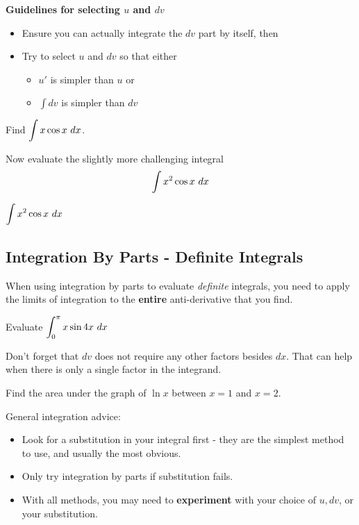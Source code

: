 \begin{boxnote}
{\bf Guidelines for selecting $u$ and $dv$}

\begin{itemize}
\item Ensure you can actually integrate the $dv$ part by itself, then
\item Try to select $u$ and $dv$ so that either 
\begin{itemize}
\item $u'$ is simpler than $u$ or
\item $\int dv$ is simpler than $dv$ 
\end{itemize}
\end{itemize}
\end{boxnote}

\newpage
\problem Find $\displaystyle \int x  \cos x ~ dx$.

\vfill


\newpage
\problem Now evaluate the slightly more challenging integral $$\displaystyle \int x^2\cos x ~ dx$$

\vfill

\newpage

\hfill $\displaystyle \int x^2\cos x ~ dx$

\newpage 

\subsection*{Integration By Parts - Definite Integrals}
When using integration by parts to evaluate {\em definite} integrals,
you need to apply the limits of integration to the {\bf entire}
anti-derivative that you find.

\problem Evaluate $\displaystyle \int_{0}^{\pi} x  \sin 4x ~ dx$

\newpage 

Don't forget that $dv$ does not require any other factors besides
$dx$.  That can help when there is only a single factor in the
integrand.

\problem Find the area under the graph of $\ln x$ between $x=1$ and
$x=2$.

\newpage

General integration advice:
\begin{itemize}
\item Look for a substitution in your integral first - they are the simplest method to use,
and usually the most obvious.
\item Only try integration by parts if substitution fails. 
\item With all methods, you may need to {\bf experiment} with your
  choice of $u, dv$, or your substitution.
\end{itemize}




